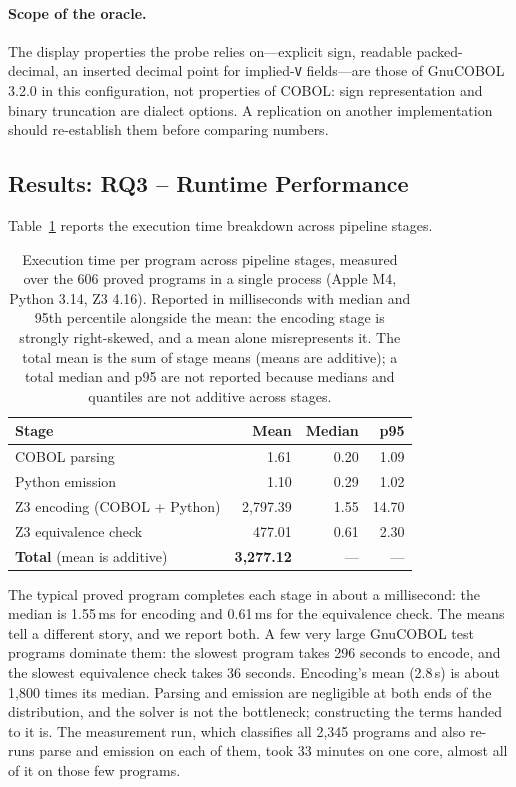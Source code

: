 \documentclass[sigconf,nonacm]{acmart}
\begin{document}
\paragraph{Scope of the oracle.} The display properties the probe relies on---explicit sign, readable packed-decimal, an inserted decimal point for implied-\texttt{V} fields---are those of GnuCOBOL 3.2.0 in this configuration, not properties of COBOL: sign representation and binary truncation are dialect options. A replication on another implementation should re-establish them before comparing numbers.

\subsection{Results: RQ3 -- Runtime Performance}\label{sec:rq4}

Table~\ref{tab:rq4} reports the execution time breakdown across pipeline stages.

\begin{table}[t]
\centering
\caption{Execution time per program across pipeline stages, measured over the 606 proved programs in a single process (Apple M4, Python 3.14, Z3 4.16). Reported in milliseconds with median and 95th percentile alongside the mean: the encoding stage is strongly right-skewed, and a mean alone misrepresents it. The total mean is the sum of stage means (means are additive); a total median and p95 are not reported because medians and quantiles are not additive across stages.}
\label{tab:rq4}
\small
\begin{tabular}{lrrr}
\toprule
\textbf{Stage} & \textbf{Mean} & \textbf{Median} & \textbf{p95} \\
\midrule
COBOL parsing                    & 1.61 & 0.20 & 1.09 \\
Python emission                  & 1.10 & 0.29 & 1.02 \\
Z3 encoding (COBOL + Python)     & 2{,}797.39 & 1.55 & 14.70 \\
Z3 equivalence check             & 477.01 & 0.61 & 2.30 \\
\midrule
\textbf{Total} (mean is additive)& \textbf{3{,}277.12} & --- & --- \\
\bottomrule
\end{tabular}
\end{table}

The typical proved program completes each stage in about a millisecond: the median is 1.55\,ms for encoding and 0.61\,ms for the equivalence check. The means tell a different story, and we report both. A few very large GnuCOBOL test programs dominate them: the slowest program takes 296 seconds to encode, and the slowest equivalence check takes 36 seconds. Encoding's mean (2.8\,s) is about 1{,}800 times its median. Parsing and emission are negligible at both ends of the distribution, and the solver is not the bottleneck; constructing the terms handed to it is. The measurement run, which classifies all 2{,}345 programs and also re-runs parse and emission on each of them, took 33 minutes on one core, almost all of it on those few programs.
\end{document}
